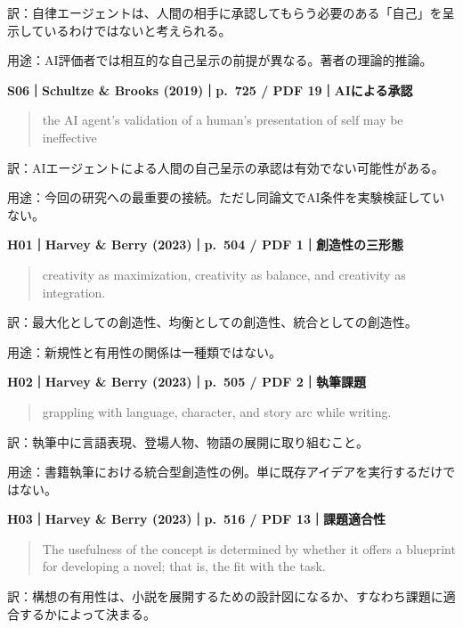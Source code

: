 \documentclass[
  11pt,
  a4paper,
]{article}
\begin{document}
訳：自律エージェントは、人間の相手に承認してもらう必要のある「自己」を呈示しているわけではないと考えられる。

用途：AI評価者では相互的な自己呈示の前提が異なる。著者の理論的推論。


\textbf{S06｜Schultze \& Brooks (2019)｜p.~725 / PDF 19｜AIによる承認}

\begin{quote}
the AI agent's validation of a human's presentation of self may be
ineffective
\end{quote}

訳：AIエージェントによる人間の自己呈示の承認は有効でない可能性がある。

用途：今回の研究への最重要の接続。ただし同論文でAI条件を実験検証していない。


\textbf{H01｜Harvey \& Berry (2023)｜p.~504 / PDF 1｜創造性の三形態}

\begin{quote}
creativity as maximization, creativity as balance, and creativity as
integration.
\end{quote}

訳：最大化としての創造性、均衡としての創造性、統合としての創造性。

用途：新規性と有用性の関係は一種類ではない。


\textbf{H02｜Harvey \& Berry (2023)｜p.~505 / PDF 2｜執筆課題}

\begin{quote}
grappling with language, character, and story arc while writing.
\end{quote}

訳：執筆中に言語表現、登場人物、物語の展開に取り組むこと。

用途：書籍執筆における統合型創造性の例。単に既存アイデアを実行するだけではない。


\textbf{H03｜Harvey \& Berry (2023)｜p.~516 / PDF 13｜課題適合性}

\begin{quote}
The usefulness of the concept is determined by whether it offers a
blueprint for developing a novel; that is, the fit with the task.
\end{quote}

訳：構想の有用性は、小説を展開するための設計図になるか、すなわち課題に適合するかによって決まる。
\end{document}

